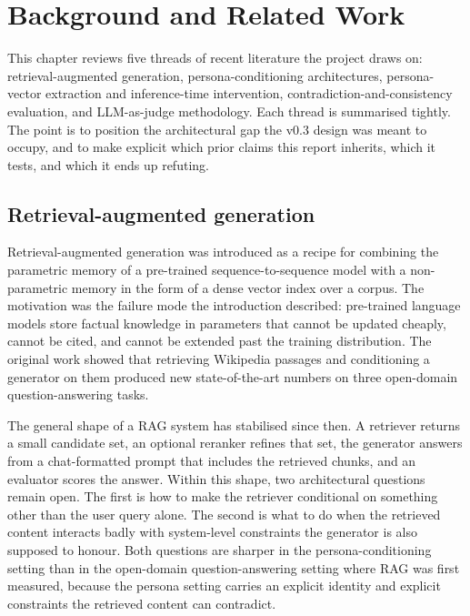 \chapter{Background and Related Work}
\label{ch:background}

This chapter reviews five threads of recent literature the project draws on: retrieval-augmented generation, persona-conditioning architectures, persona-vector extraction and inference-time intervention, contradiction-and-consistency evaluation, and LLM-as-judge methodology. Each thread is summarised tightly. The point is to position the architectural gap the v0.3 design was meant to occupy, and to make explicit which prior claims this report inherits, which it tests, and which it ends up refuting.

\section{Retrieval-augmented generation}

Retrieval-augmented generation was introduced as a recipe for combining the parametric memory of a pre-trained sequence-to-sequence model with a non-parametric memory in the form of a dense vector index over a corpus\autocite{lewis2020rag}. The motivation was the failure mode the introduction described: pre-trained language models store factual knowledge in parameters that cannot be updated cheaply, cannot be cited, and cannot be extended past the training distribution. The original work showed that retrieving Wikipedia passages and conditioning a generator on them produced new state-of-the-art numbers on three open-domain question-answering tasks.

The general shape of a RAG system has stabilised since then. A retriever returns a small candidate set, an optional reranker refines that set, the generator answers from a chat-formatted prompt that includes the retrieved chunks, and an evaluator scores the answer. Within this shape, two architectural questions remain open. The first is how to make the retriever conditional on something other than the user query alone. The second is what to do when the retrieved content interacts badly with system-level constraints the generator is also supposed to honour. Both questions are sharper in the persona-conditioning setting than in the open-domain question-answering setting where RAG was first measured, because the persona setting carries an explicit identity and explicit constraints the retrieved content can contradict.

